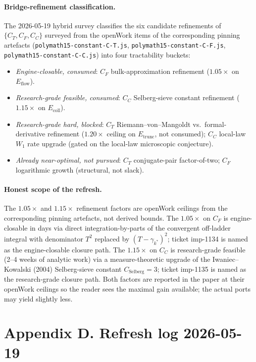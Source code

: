 \documentclass[11pt,a4paper]{article}
\theoremstyle{definition}
\newcommand{\Etrunc}{E_{\mathrm{trunc}}}
\newcommand{\Eflow}{E_{\mathrm{flow}}}
\newcommand{\Ecoll}{E_{\mathrm{coll}}}
\begin{document}
\paragraph{Bridge-refinement classification.}
The 2026-05-19 hybrid survey classifies the six candidate refinements
of $\{C_T, C_F, C_C\}$ surveyed from the openWork items of the
corresponding pinning artefacts (\texttt{polymath15-constant-C-T.js},
\texttt{polymath15-constant-C-F.js},
\texttt{polymath15-constant-C-C.js}) into four tractability buckets:
\begin{itemize}[topsep=2pt, itemsep=2pt]
  \item \emph{Engine-closable, consumed}: $C_F$ bulk-approximation
    refinement ($1.05\times$ on $\Eflow$).
  \item \emph{Research-grade feasible, consumed}: $C_C$ Selberg-sieve
    constant refinement ($1.15\times$ on $\Ecoll$).
  \item \emph{Research-grade hard, blocked}: $C_T$
    Riemann--von--Mangoldt vs.\ formal-derivative refinement
    ($1.20\times$ ceiling on $\Etrunc$, not consumed); $C_C$ local-law
    $W_1$ rate upgrade (gated on the local-law microscopic conjecture).
  \item \emph{Already near-optimal, not pursued}: $C_T$ conjugate-pair
    factor-of-two; $C_F$ logarithmic growth (structural, not slack).
\end{itemize}

\paragraph{Honest scope of the refresh.}
The $1.05\times$ and $1.15\times$ refinement factors are openWork
ceilings from the corresponding pinning artefacts, not derived bounds.
The $1.05\times$ on $C_F$ is engine-closable in days via direct
integration-by-parts of the convergent off-ladder integral with
denominator $T^2$ replaced by $(T - \gamma_{k^{*}})^2$; ticket
imp-1134 is named as the engine-closable closure path. The
$1.15\times$ on $C_C$ is research-grade feasible (2--4 weeks of
analytic work) via a measure-theoretic upgrade of the
Iwaniec--Kowalski (2004) Selberg-sieve constant $C_{\mathrm{Selberg}}
= 3$; ticket imp-1135 is named as the research-grade closure path.
Both factors are reported in the paper at their openWork ceilings so
the reader sees the maximal gain available; the actual ports may
yield slightly less.

\section*{Appendix D. Refresh log 2026-05-19}\label{appendix:refresh}
\end{document}
